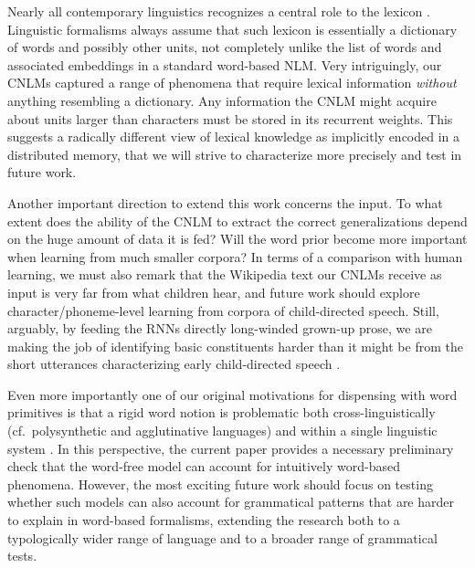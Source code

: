 Nearly all contemporary linguistics recognizes a central role to the
lexicon \cite[see, e.g.,][for very different
perspectives]{Sag:etal:2003,Goldberg:2005,Radford:2006,Bresnan:etal:2016,Jezek:2016}. Linguistic
formalisms always assume that such lexicon is essentially a dictionary
of words and possibly other units, not completely unlike the list of
words and associated embeddings in a standard word-based NLM. Very
intriguingly, our CNLMs captured a range of phenomena that require
lexical information \emph{without} anything resembling a
dictionary. Any information the CNLM might acquire about units larger
than characters must be stored in its recurrent weights. This suggests
a radically different view of lexical knowledge as implicitly encoded
in a distributed memory, that we will strive to characterize more
precisely and test in future work.

Another important direction to extend this work concerns the input. To
what extent does the ability of the CNLM to extract the correct
generalizations depend on the huge amount of data it is fed?  Will the
word prior become more important when learning from much smaller
corpora? In terms of a comparison with human learning, we must also
remark that the Wikipedia text our CNLMs receive as input is very far
from what children hear, and future work should explore
character/phoneme-level learning from corpora of child-directed
speech. Still, arguably, by feeding the RNNs directly long-winded
grown-up prose, we are making the job of identifying basic
constituents harder than it might be from the short utterances
characterizing early child-directed speech \cite{Tomasello:2003}.

Even more importantly one of our original motivations for dispensing
with word primitives is that a rigid word notion is problematic both
cross-linguistically (cf.~polysynthetic and agglutinative languages)
and within a single linguistic system \cite[cf.~the common view that
the lexicon hosts units at different levels of the linguistic
hierarchy, from morphemes to large syntactic constructions,
e.g.,][]{Jackendoff:1997,Croft:Cruse:2004,Goldberg:2005}. In this
perspective, the current paper provides a necessary preliminary check
that the word-free model can account for intuitively word-based
phenomena. However, the most exciting future work should focus on
testing whether such models can also account for grammatical patterns
that are harder to explain in word-based formalisms, extending the
research both to a typologically wider range of language and to a
broader range of grammatical tests.






